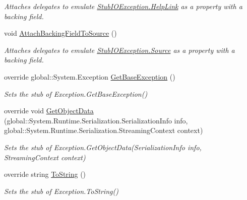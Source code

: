 \begin{DoxyCompactItemize}
\begin{DoxyCompactList}\small\item\em Attaches delegates to emulate \hyperlink{class_system_1_1_i_o_1_1_fakes_1_1_stub_i_o_exception_aba74f05c68b48403843a7fd3eda63e37}{Stub\-I\-O\-Exception.\-Help\-Link} as a property with a backing field.\end{DoxyCompactList}\item 
void \hyperlink{class_system_1_1_i_o_1_1_fakes_1_1_stub_i_o_exception_a056d35741cb89102e63ae7d3e04305ce}{Attach\-Backing\-Field\-To\-Source} ()
\begin{DoxyCompactList}\small\item\em Attaches delegates to emulate \hyperlink{class_system_1_1_i_o_1_1_fakes_1_1_stub_i_o_exception_a369ede03ae458b3edb6ec4e742ee7991}{Stub\-I\-O\-Exception.\-Source} as a property with a backing field.\end{DoxyCompactList}\item 
override global\-::\-System.\-Exception \hyperlink{class_system_1_1_i_o_1_1_fakes_1_1_stub_i_o_exception_abd60f0bab60e15c46289347553a4b68d}{Get\-Base\-Exception} ()
\begin{DoxyCompactList}\small\item\em Sets the stub of Exception.\-Get\-Base\-Exception()\end{DoxyCompactList}\item 
override void \hyperlink{class_system_1_1_i_o_1_1_fakes_1_1_stub_i_o_exception_a588c572485aac8c192ea2b343fc2c58c}{Get\-Object\-Data} (global\-::\-System.\-Runtime.\-Serialization.\-Serialization\-Info info, global\-::\-System.\-Runtime.\-Serialization.\-Streaming\-Context context)
\begin{DoxyCompactList}\small\item\em Sets the stub of Exception.\-Get\-Object\-Data(\-Serialization\-Info info, Streaming\-Context context)\end{DoxyCompactList}\item 
override string \hyperlink{class_system_1_1_i_o_1_1_fakes_1_1_stub_i_o_exception_a9381fbf8f2b578b96cc90647965a46e6}{To\-String} ()
\begin{DoxyCompactList}\small\item\em Sets the stub of Exception.\-To\-String()\end{DoxyCompactList}\end{DoxyCompactItemize}
